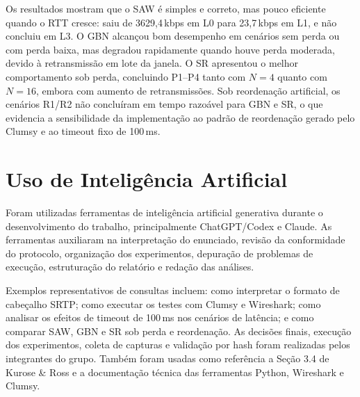 \documentclass[10pt,a4paper]{article}
\begin{document}
Os resultados mostram que o SAW é simples e correto, mas pouco eficiente quando
o RTT cresce: saiu de 3629{,}4\,kbps em L0 para 23{,}7\,kbps em L1, e não
concluiu em L3. O GBN alcançou bom desempenho em cenários sem perda ou com perda
baixa, mas degradou rapidamente quando houve perda moderada, devido à
retransmissão em lote da janela. O SR apresentou o melhor comportamento sob
perda, concluindo P1--P4 tanto com $N=4$ quanto com $N=16$, embora com aumento de
retransmissões. Sob reordenação artificial, os cenários R1/R2 não concluíram em
tempo razoável para GBN e SR, o que evidencia a sensibilidade da implementação
ao padrão de reordenação gerado pelo Clumsy e ao timeout fixo de 100\,ms.

\section{Uso de Inteligência Artificial}

Foram utilizadas ferramentas de inteligência artificial generativa durante o
desenvolvimento do trabalho, principalmente ChatGPT/Codex e Claude. As
ferramentas auxiliaram na interpretação do enunciado, revisão da conformidade do
protocolo, organização dos experimentos, depuração de problemas de execução,
estruturação do relatório e redação das análises.

Exemplos representativos de consultas incluem: como interpretar o formato de
cabeçalho SRTP; como executar os testes com Clumsy e Wireshark; como analisar os
efeitos de timeout de 100\,ms nos cenários de latência; e como comparar SAW, GBN
e SR sob perda e reordenação. As decisões finais, execução dos experimentos,
coleta de capturas e validação por hash foram realizadas pelos integrantes do
grupo. Também foram usadas como referência a Seção 3.4 de Kurose \& Ross e a
documentação técnica das ferramentas Python, Wireshark e Clumsy.
\end{document}
